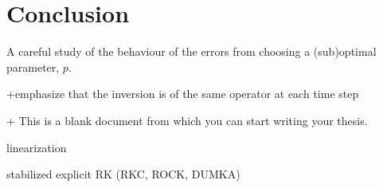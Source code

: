 \chapter{Conclusion}

A careful study of the behaviour of the errors from choosing a (sub)optimal parameter, $p$.


+emphasize that the inversion is of the same operator at each time step

+
	This is a blank document from which you can start writing your thesis.
	
	linearization
	
	stabilized explicit RK (RKC, ROCK, DUMKA)
	